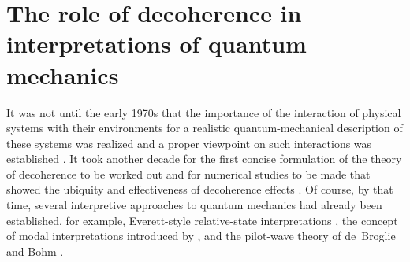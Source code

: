 \documentclass[rmp,aps,amsmath,amsfonts,noshowkeys,noshowpacs,12pt]{revtex4}
\begin{document}
\section{\label{sec:interpret}The role of decoherence in
  interpretations of quantum mechanics}

It was not until the early 1970s that the importance of the
interaction of physical systems with their environments for a
realistic quantum-mechanical description of these systems was realized
and a proper viewpoint on such interactions was established
\citep{Zeh:1970:yt,Zeh:1973:wq}. It took another decade for the first
concise formulation of the theory of decoherence
\citep{Zurek:1981:dd,Zurek:1982:tv} to be worked out and for numerical
studies to be made that showed the ubiquity and effectiveness of
decoherence effects \citep{Joos:1985:iu}. Of course, by that time,
several interpretive approaches to quantum mechanics had already been
established, for example, Everett-style relative-state interpretations
\citep{Everett:1957:rw}, the concept of modal interpretations
introduced by \citet{Fraassen:1973:yb,Fraassen:1991:ys}, and the
pilot-wave theory of de~Broglie and Bohm \citep{Bohm:1952:rc}.
\end{document}
